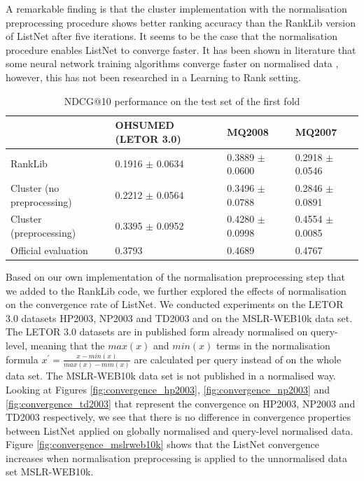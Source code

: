 A remarkable finding is that the cluster implementation with the normalisation preprocessing procedure shows better ranking accuracy than the RankLib version of ListNet after five iterations. It seems to be the case that the normalisation procedure enables ListNet to converge faster. It has been shown in literature that some neural network training algorithms converge faster on normalised data \cite{Ng1999}, however, this has not been researched in a Learning to Rank setting.\\

\begin{table}
\centering
\begin{tabular}{p{3.4cm}p{3.0cm}p{2.6cm}p{2.6cm}}\toprule
 &  OHSUMED  (LETOR 3.0) & MQ2008 & MQ2007 \\
\midrule
RankLib                             & 0.1916 $\pm$ 0.0634 & 0.3889 $\pm$ 0.0600 & 0.2918 $\pm$ 0.0546 \\
Cluster \newline (no preprocessing)	& 0.2212 $\pm$ 0.0564 & 0.3496 $\pm$ 0.0788 & 0.2846 $\pm$ 0.0891\\
Cluster \newline (preprocessing)    & 0.3395 $\pm$ 0.0952 & 0.4280 $\pm$ 0.0998 & 0.4554 $\pm$ 0.0085\\
Official evaluation                 & 0.3793 & 0.4689 & 0.4767 \\
\bottomrule
\end{tabular}
\caption{\acs{NDCG}@10 performance on the test set of the first fold}
\label{tbl:accuracy_comparison}
\end{table}

Based on our own implementation of the normalisation preprocessing step that we added to the RankLib code, we further explored the effects of normalisation on the convergence rate of ListNet. We conducted experiments on the LETOR 3.0 datasets HP2003, NP2003 and TD2003 and on the MSLR-WEB10k data set. The LETOR 3.0 datasets are in published form already normalised on query-level, meaning that the $max(x)$ and $min(x)$ terms in the normalisation formula $x^{'} = \frac{x-min(x)}{max(x)-min(x)}$ are calculated per query instead of on the whole data set. The MSLR-WEB10k data set is not published in a normalised way. Looking at Figures \ref{fig:convergence_hp2003}, \ref{fig:convergence_np2003} and \ref{fig:convergence_td2003} that represent the convergence on HP2003, NP2003 and TD2003 respectively, we see that there is no difference in convergence properties between ListNet applied on globally normalised and query-level normalised data. Figure \ref{fig:convergence_mslrweb10k} shows that the ListNet convergence increases when normalisation preprocessing is applied to the unnormalised data set MSLR-WEB10k.

